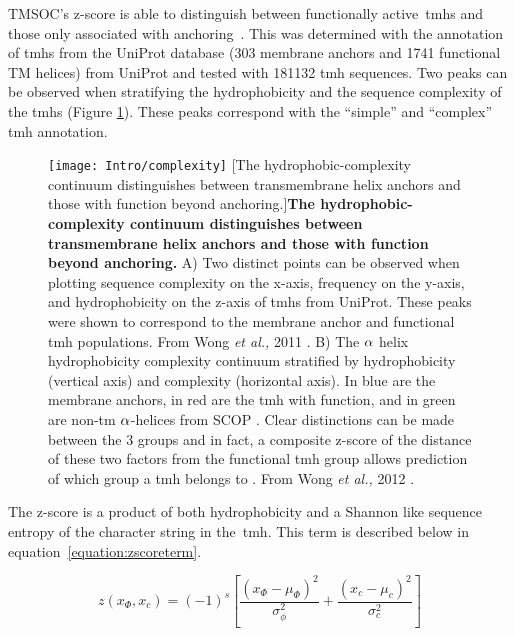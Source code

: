 TMSOC's z-score is able to distinguish between functionally active~\gls{tmh}s and those only associated with anchoring~\cite{Wong2011, Wong2012}.
This was determined with the annotation of \gls{tmh}s from the UniProt database (303 membrane anchors and 1741 functional TM helices) from UniProt \cite{TheUniProtConsortium2014} and tested with 181132 \gls{tmh} sequences.
Two peaks can be observed when stratifying the hydrophobicity and the sequence complexity of the \gls{tmh}s (Figure \ref{fig:complexity}).
These peaks correspond with the ``simple'' and ``complex'' \gls{tmh} annotation.

\begin{figure}[ht]
\centering
\texttt{[image: Intro/complexity]}
		[The hydrophobic\--complexity continuum distinguishes between transmembrane helix anchors and those with function beyond anchoring.]{\textbf{The hydrophobic\--complexity continuum distinguishes between transmembrane helix anchors and those with function beyond anchoring.}
		A) Two distinct points can be observed when plotting sequence complexity on the x\--axis, frequency on the y\--axis, and hydrophobicity on the z\--axis of \gls{tmh}s from UniProt.
		These peaks were shown to correspond to the membrane anchor and functional \gls{tmh} populations.
		From Wong \textit{et al.,} 2011 \cite{Wong2011}.
		B) The $\protect\alpha$ helix hydrophobicity complexity continuum stratified by hydrophobicity (vertical axis) and complexity (horizontal axis).
		In blue are the membrane anchors, in red are the \gls{tmh} with function, and in green are non\--\gls{tm} $\protect\alpha$\--helices from SCOP \cite{Murzin1995}.
		Clear distinctions can be made between the 3 groups and in fact, a composite z-score of the distance of these two factors from the functional \gls{tmh} group allows prediction of which group a \gls{tmh} belongs to \cite{Wong2011, Wong2012}.
		From Wong \textit{et al.,} 2012 \cite{Wong2012}.
		}
\label{fig:complexity}
\end{figure}

The z-score is a product of both hydrophobicity and a Shannon like sequence entropy \cite{Wong2011, Wong2012} of the character string in the~\gls{tmh}. This term is described below in equation~\ref{equation:zscoreterm}.

\begin{equation} \label{equation:zscoreterm}
z({x}_{\Phi},{x}_{c})={(-1)}^{s}\left[\frac{{({x}_{\Phi}-{\mu}_{\Phi})}^{2}}{{\sigma}_{\phi}^{2}}+\frac{{({x}_{c}-{\mu}_{c})}^{2}}{{\sigma}_{c}^{2}}\right]
\end{equation}

